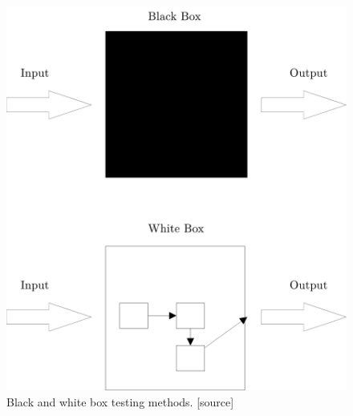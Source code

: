 \documentclass[english,12pt,a4paper,pdftex,elec,utf8]{aaltothesis}
\begin{document}
\begin{figure}[h!]
\centering
\includegraphics[scale=0.4]{whiteblackbox}
\caption{Black and white box testing methods. [source]}
\label{boxfigurespuge}
\end{figure} 
\end{document}
